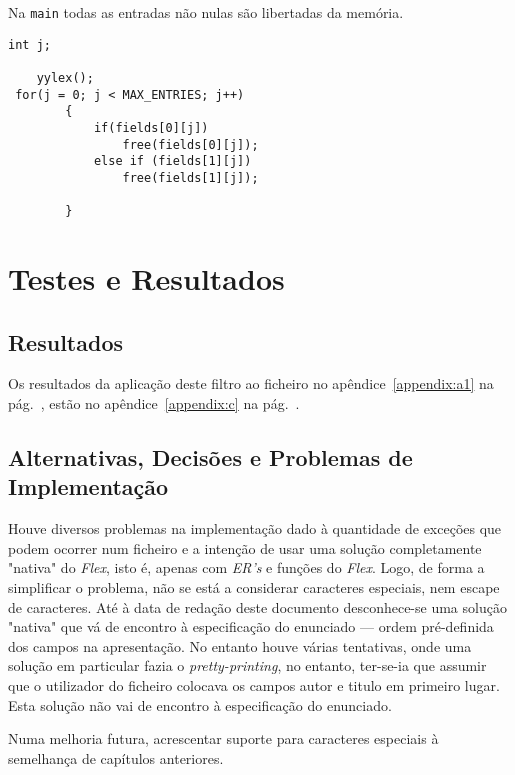 Na \texttt{main} todas as entradas não nulas são libertadas da memória. 
\begin{verbatim}
int j;

    yylex();
 for(j = 0; j < MAX_ENTRIES; j++)
        {
            if(fields[0][j])
                free(fields[0][j]);
            else if (fields[1][j])
                free(fields[1][j]);

        }

\end{verbatim}

\section{Testes e Resultados}
\label{sec:ts:b2}

\subsection{Resultados}

Os resultados da aplicação deste filtro ao ficheiro no
apêndice~\ref{appendix:a1} na pág.~\pageref{appendix:a1}, estão no
apêndice~\ref{appendix:c} na pág.~\pageref{appendix:c}. 

\subsection{Alternativas, Decisões e Problemas de Implementação}

Houve diversos problemas na implementação dado à quantidade de exceções que
podem ocorrer num ficheiro  e a intenção de usar uma solução
completamente "nativa" do \emph{Flex}, isto é, apenas com \emph{ER's} e funções do
\emph{Flex}. Logo, de forma a simplificar o problema, não se está a considerar
caracteres especiais, nem escape de caracteres. Até à data de redação deste
documento
desconhece-se uma solução "nativa" que vá de encontro à especificação do enunciado
--- ordem pré-definida dos campos na apresentação. No entanto houve várias
tentativas, onde uma solução em particular fazia o \emph{pretty-printing}, no
entanto, ter-se-ia que assumir que o utilizador do ficheiro  colocava os campos
autor e titulo em primeiro lugar. Esta solução não vai de encontro
à especificação do enunciado.

Numa melhoria futura, acrescentar suporte para caracteres especiais à semelhança
de capítulos anteriores.

